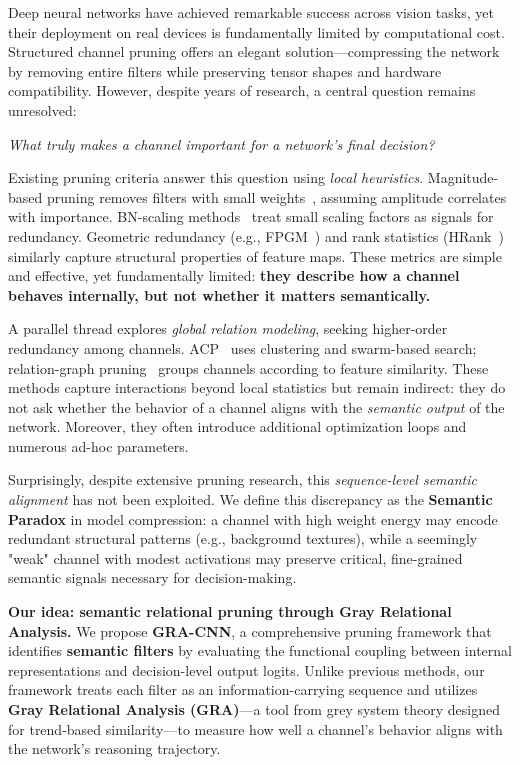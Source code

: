 \documentclass[sn-mathphys,Numbered]{sn-jnl}
\begin{document}
Deep neural networks have achieved remarkable success across vision tasks, yet their deployment on real devices is fundamentally limited by computational cost. Structured channel pruning offers an elegant solution—compressing the network by removing entire filters while preserving tensor shapes and hardware compatibility. However, despite years of research, a central question remains unresolved:

\emph{What truly makes a channel important for a network’s final decision?}

Existing pruning criteria answer this question using \emph{local heuristics}. Magnitude-based pruning removes filters with small weights~\cite{he2017channel}, assuming amplitude correlates with importance. BN-scaling methods~\cite{liu2017network_slimming} treat small scaling factors as signals for redundancy. Geometric redundancy (e.g., FPGM~\cite{he2019fpgm}) and rank statistics (HRank~\cite{lin2020hrank}) similarly capture structural properties of feature maps. These metrics are simple and effective, yet fundamentally limited:  
\textbf{they describe how a channel behaves internally, but not whether it matters semantically.}

A parallel thread explores \emph{global relation modeling}, seeking higher-order redundancy among channels. ACP~\cite{chang2022acp} uses clustering and swarm-based search; relation-graph pruning~\cite{hu2023dynamic_pruning,li2023lightweight_dnn,cheng2022channel} groups channels according to feature similarity. These methods capture interactions beyond local statistics but remain indirect: they do not ask whether the behavior of a channel aligns with the \emph{semantic output} of the network. Moreover, they often introduce additional optimization loops and numerous ad-hoc parameters.


\vspace{0.5em}
Surprisingly, despite extensive pruning research, this \emph{sequence-level semantic alignment} has not been exploited. We define this discrepancy as the \textbf{Semantic Paradox} in model compression: a channel with high weight energy may encode redundant structural patterns (e.g., background textures), while a seemingly "weak" channel with modest activations may preserve critical, fine-grained semantic signals necessary for decision-making. 

\vspace{0.5em}
\noindent\textbf{Our idea: semantic relational pruning through Gray Relational Analysis.}  
We propose \textbf{GRA-CNN}, a comprehensive pruning framework that identifies \textbf{semantic filters} by evaluating the functional coupling between internal representations and decision-level output logits. Unlike previous methods, our framework treats each filter as an information-carrying sequence and utilizes \textbf{Gray Relational Analysis (GRA)}—a tool from grey system theory designed for trend-based similarity—to measure how well a channel's behavior aligns with the network's reasoning trajectory.
\end{document}
